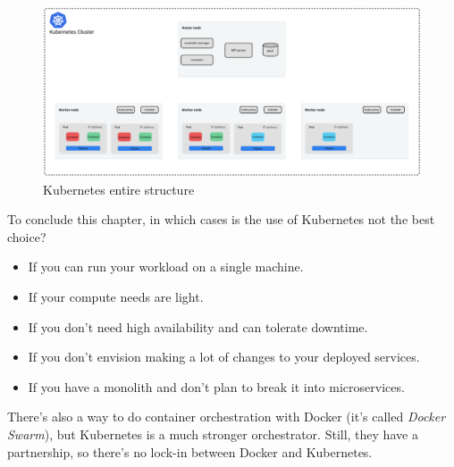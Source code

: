 \begin{figure} [H]
    \centering
    \includegraphics[width=1\textwidth]{images/Cloud/K8sStructure.png}
    \caption{Kubernetes entire structure}
    \label{fig:K8sStructure}
\end{figure}

To conclude this chapter, in which cases is the use of Kubernetes not the best choice?
\begin{itemize}
    \item If you can run your workload on a single machine.
    \item If your compute needs are light.
    \item If you don't need high availability and can tolerate downtime.
    \item If you don't envision making a lot of changes to your deployed services.
    \item If you have a monolith and don't plan to break it into microservices.
\end{itemize}

There's also a way to do container orchestration with Docker (it's called \emph{Docker Swarm}), but Kubernetes is a much stronger orchestrator. Still, they have a partnership, so there's no lock-in between Docker and Kubernetes.
